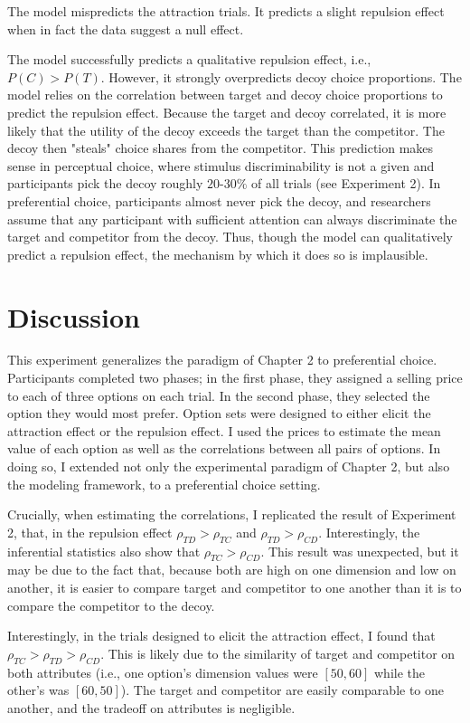 The model mispredicts the attraction trials. It predicts a slight repulsion effect when in fact the data suggest a null effect.

The model successfully predicts a qualitative repulsion effect, i.e., $P(C)>P(T)$. However, it strongly overpredicts decoy choice proportions. The model relies on the correlation between target and decoy choice proportions to predict the repulsion effect. Because the target and decoy correlated, it is more likely that the utility of the decoy exceeds the target than the competitor. The decoy then "steals" choice shares from the competitor. This prediction makes sense in perceptual choice, where stimulus discriminability is not a given and participants pick the decoy roughly $20$-$30\%$ of all trials (see Experiment 2). In preferential choice, participants almost never pick the decoy, and researchers assume that any participant with sufficient attention can always discriminate the target and competitor from the decoy. Thus, though the model can qualitatively predict a repulsion effect, the mechanism by which it does so is implausible.

\section{Discussion}

This experiment generalizes the paradigm of Chapter 2 to preferential choice. Participants completed two phases; in the first phase, they assigned a selling price to each of three options on each trial. In the second phase, they selected the option they would most prefer. Option sets were designed to either elicit the attraction effect or the repulsion effect. I used the prices to estimate the mean value of each option as well as the correlations between all pairs of options. In doing so, I extended not only the experimental paradigm of Chapter 2, but also the modeling framework, to a preferential choice setting.

Crucially, when estimating the correlations, I replicated the result of Experiment 2, that, in the repulsion effect $\rho_{TD}>\rho_{TC}$ and $\rho_{TD}>\rho_{CD}$. Interestingly, the inferential statistics also show that $\rho_{TC}>\rho_{CD}$. This result was unexpected, but it may be due to the fact that, because both are high on one dimension and low on another, it is easier to compare target and competitor to one another than it is to compare the competitor to the decoy. 

Interestingly, in the trials designed to elicit the attraction effect, I found that $\rho_{TC}>\rho_{TD}>\rho_{CD}$. This is likely due to the similarity of target and competitor on both attributes (i.e., one option's dimension values were $[50,60]$ while the other's was $[60,50]$). The target and competitor are easily comparable to one another, and the tradeoff on attributes is negligible.

